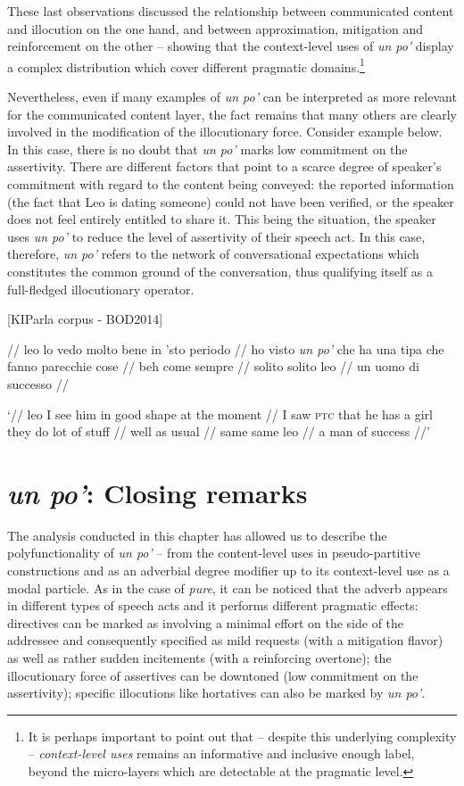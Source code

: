 \hspace*{-0.6pt}These last observations discussed the relationship between communicated content and illocution on the one hand, and between approximation, mitigation and reinforcement on the other – showing that the context-level uses of \textit{un po’} display a complex distribution which cover different pragmatic domains.\footnote{It is perhaps important to point out that – despite this underlying complexity – \textit{context-level uses} remains an informative and inclusive enough label, beyond the micro-layers which are detectable at the pragmatic level.}

Nevertheless, even if many examples of \textit{un po’} can be interpreted as more relevant for the communicated content layer, the fact remains that many others are clearly involved in the modification of the illocutionary force. Consider example  below. In this case, there is no doubt that \textit{un po’} marks low commitment on the assertivity. There are different factors that point to a scarce degree of speaker’s commitment with regard to the content being conveyed: the reported information (the fact that Leo is dating someone) could not have been verified, or the speaker does not feel entirely entitled to share it. This being the situation, the speaker uses \textit{un po’} to reduce the level of assertivity of their speech act. In this case, therefore, \textit{un po’} refers to the network of conversational expectations which constitutes the common ground of the conversation, thus qualifying itself as a full-fledged illocutionary operator.

\ea%
    \label{ex:key:87}

          [KIParla corpus - BOD2014]

// leo lo vedo molto bene in ’sto periodo // ho visto \textit{un po’} che ha una tipa che fanno parecchie cose // beh come sempre // solito solito leo // un uomo di successo //

\glt ‘// leo I see him in good shape at the moment // I saw \textsc{ptc} that he has a girl they do lot of stuff // well as usual // same same leo // a man of success //’
    \z %

\section{\textit{un po’}: Closing remarks}
\hypertarget{Toc124860666}{}
The analysis conducted in this chapter has allowed us to describe the polyfunctionality of \textit{un po’} – from the content-level uses in pseudo-partitive constructions and as an adverbial degree modifier up to its context-level use as a modal particle. As in the case of \textit{pure}, it can be noticed that the adverb appears in different types of speech acts and it performs different pragmatic effects: directives can be marked as involving a minimal effort on the side of the addressee and consequently specified as mild requests (with a mitigation flavor) as well as rather sudden incitements (with a reinforcing overtone); the illocutionary force of assertives can be downtoned (low commitment on the assertivity); specific illocutions like hortatives can also be marked by \textit{un po’}.


